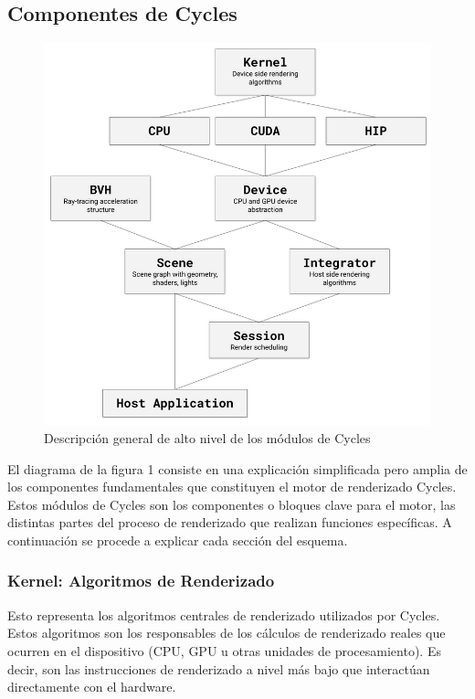 \documentclass{article}
\begin{document}
\subsection{Componentes de Cycles}
\begin{figure}[h] %
  \centering %
  \includegraphics[scale=0.4]{Imagenes/Cycles-modules-architecture.png} %
  \caption{Descripción general de alto nivel de los módulos de Cycles} %
  \label{fig:Cycles_diagram} %
\end{figure}

El diagrama de la figura 1 consiste en una explicación simplificada pero amplia de los componentes 
fundamentales que constituyen el motor de renderizado Cycles. Estos módulos de Cycles son los 
componentes o bloques clave para el motor, las distintas partes del proceso de renderizado que 
realizan funciones específicas. A continuación se procede a explicar cada sección del esquema.

\subsubsection{Kernel: Algoritmos de Renderizado}
Esto representa los algoritmos centrales de renderizado utilizados por Cycles. 
Estos algoritmos son los responsables de los cálculos de renderizado reales que ocurren en el
dispositivo (CPU, GPU u otras unidades de procesamiento). Es decir, son las instrucciones de 
renderizado a nivel más bajo que interactúan directamente con el hardware.
\end{document}
